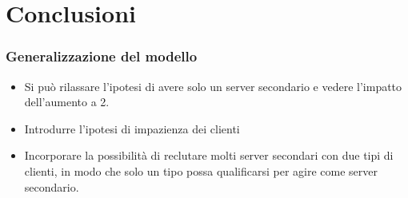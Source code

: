 \documentclass{beamer}
\begin{document}


\section{Conclusioni}



    \begin{frame}
    \frametitle{Generalizzazione del modello}
    \begin{itemize}
        \item Si può rilassare l'ipotesi di avere solo un server secondario e vedere l'impatto dell'aumento a 2.
        \item Introdurre l'ipotesi di impazienza dei clienti
        \item Incorporare la possibilità di reclutare molti server secondari con due tipi di clienti, in modo che solo un tipo possa qualificarsi per agire come server secondario.
    \end{itemize}
\end{frame}
\end{document}
